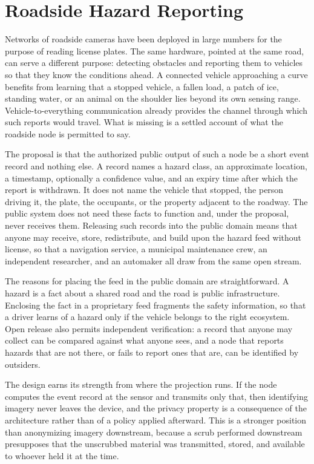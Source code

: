 \documentclass[11pt]{article}
\theoremstyle{definition}
\begin{document}
\section{Roadside Hazard Reporting}

Networks of roadside cameras have been deployed in large numbers for the purpose of reading license plates. The same hardware, pointed at the same road, can serve a different purpose: detecting obstacles and reporting them to vehicles so that they know the conditions ahead. A connected vehicle approaching a curve benefits from learning that a stopped vehicle, a fallen load, a patch of ice, standing water, or an animal on the shoulder lies beyond its own sensing range. Vehicle-to-everything communication already provides the channel through which such reports would travel. What is missing is a settled account of what the roadside node is permitted to say.

The proposal is that the authorized public output of such a node be a short event record and nothing else. A record names a hazard class, an approximate location, a timestamp, optionally a confidence value, and an expiry time after which the report is withdrawn. It does not name the vehicle that stopped, the person driving it, the plate, the occupants, or the property adjacent to the roadway. The public system does not need these facts to function and, under the proposal, never receives them. Releasing such records into the public domain means that anyone may receive, store, redistribute, and build upon the hazard feed without license, so that a navigation service, a municipal maintenance crew, an independent researcher, and an automaker all draw from the same open stream.

The reasons for placing the feed in the public domain are straightforward. A hazard is a fact about a shared road and the road is public infrastructure. Enclosing the fact in a proprietary feed fragments the safety information, so that a driver learns of a hazard only if the vehicle belongs to the right ecosystem. Open release also permits independent verification: a record that anyone may collect can be compared against what anyone sees, and a node that reports hazards that are not there, or fails to report ones that are, can be identified by outsiders.

The design earns its strength from where the projection runs. If the node computes the event record at the sensor and transmits only that, then identifying imagery never leaves the device, and the privacy property is a consequence of the architecture rather than of a policy applied afterward. This is a stronger position than anonymizing imagery downstream, because a scrub performed downstream presupposes that the unscrubbed material was transmitted, stored, and available to whoever held it at the time.
\end{document}
